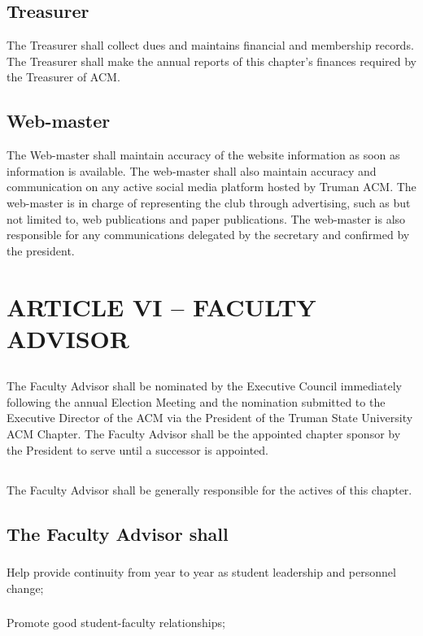 \documentclass[12pt]{article}
\begin{document}
\subsection{Treasurer}	The Treasurer shall collect dues and maintains financial and membership records. The Treasurer shall make the annual reports of this chapter's finances required by the Treasurer of ACM.
\subsection{Web-master}
The Web-master shall maintain accuracy of the website information as soon as information is available. The web-master shall also maintain accuracy and communication on any active social media platform hosted by Truman ACM. The web-master is in charge of representing the club through advertising, such as but not limited to, web publications and paper publications. The web-master is also responsible for any communications delegated by the secretary and confirmed by the president. 

\section{ARTICLE VI – FACULTY ADVISOR}
\subsection{}	The Faculty Advisor shall be nominated by the Executive Council immediately following the annual Election Meeting and the nomination submitted to the Executive Director of the ACM via the President of the Truman State University ACM Chapter. The Faculty Advisor shall be the appointed chapter sponsor by the President to serve until a successor is appointed.
\subsection{}	The Faculty Advisor shall be generally responsible for the actives of this chapter.
\subsection{The Faculty Advisor shall}
\subsubsection{}	Help provide continuity from year to year as student leadership and personnel change;
\subsubsection{}	Promote good student-faculty relationships;
\end{document}
